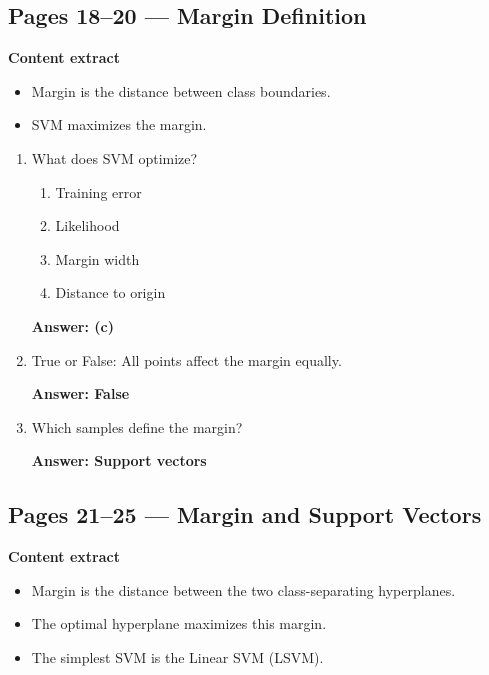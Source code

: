 \documentclass[12pt]{article}
\begin{document}
\subsection*{Pages 18--20 — Margin Definition}

\textbf{Content extract}
\begin{itemize}
	\item Margin is the distance between class boundaries.
	\item SVM maximizes the margin.
\end{itemize}

\begin{enumerate}
	\item What does SVM optimize?
	\begin{enumerate}
		\item Training error
		\item Likelihood
		\item Margin width
		\item Distance to origin
	\end{enumerate}
	\textbf{Answer: (c)}
	
	\item True or False: All points affect the margin equally.
	
	\textbf{Answer: False}
	
	\item Which samples define the margin?
	
	\textbf{Answer: Support vectors}
\end{enumerate}


\subsection*{Pages 21--25 — Margin and Support Vectors}

\textbf{Content extract}
\begin{itemize}
	\item Margin is the distance between the two class-separating hyperplanes.
	\item The optimal hyperplane maximizes this margin.
	\item The simplest SVM is the Linear SVM (LSVM).
\end{itemize}
\end{document}
